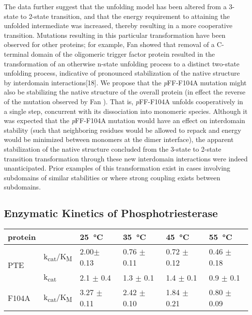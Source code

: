 \begin{refsection}
The data further suggest that the unfolding model has been altered
from a 3-state to 2-state transition, and that the energy requirement to
attaining the unfolded intermediate was increased, thereby resulting in a more
cooperative transition. Mutations resulting in this particular transformation
have been observed for other proteins; for example, Fan  showed
that removal of a C-terminal domain of the oligomeric  trigger
factor protein resulted in the transformation of an otherwise n-state unfolding
process to a distinct two-state unfolding process, indicative of pronounced
stabilization of the native structure by interdomain interactions[18]. We
propose that the \emph{p}FF-F104A mutation might also be stabilizing the native
structure of the overall protein (in effect the reverse of the mutation
observed by Fan )\cite{Fan2008}. That is, \emph{p}FF-F104A unfolds
cooperatively in a single step, concurrent with its dissociation into monomeric
species. Although it was expected that the \emph{p}FF-F104A mutation would have an
effect on interdomain stability (such that neighboring residues would be
allowed to repack and energy would be minimized between monomers at the dimer
interface), the apparent stabilization of the native structure concluded from
the 3-state to 2-state transition transformation through these new interdomain
interactions were indeed unanticipated. Prior examples of this transformation
exist in cases involving subdomains of similar stabilities or where strong
coupling exists between subdomains\cite{Tsytlonok2013}.

\subsection{Enzymatic Kinetics of Phosphotriesterase}

\begin{table}[h!]
\centering
    \begin{tabular}{llllll}
    \hline
    protein                 &  & \SI{25}{\celsius} & \SI{35}{\celsius} &
    \SI{45}{\celsius} & \SI{55}{\celsius} \\ 
    \hline
    \multirow{2}{*}{PTE}    & k\textsubscript{cat}/K\textsubscript{M} & 2.00$
    \pm$ 0.13 & 0.76 $\pm$ 0.11 & 0.72 $\pm$ 0.12 & 0.46 $\pm$ 0.18 \\
    
    & k\textsubscript{cat} & 2.1 $\pm$ 0.4 & 1.3 $\pm$ 0.1 & 1.4 $\pm$ 0.1 & 0.9
    $\pm$ 0.1 \\
    \multirow{2}{*}{F104A}  & k\textsubscript{cat}/K\textsubscript{M} & 3.27
    $\pm$ 0.11 & 2.42 $\pm$ 0.10 & 1.84 $\pm$ 0.21 & 0.80 $\pm$ 0.09 \\ 
    

\end{tabular}
\end{table}
\end{refsection}
